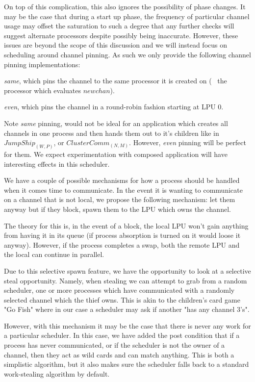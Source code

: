 On top of this complication, this also ignores the possibility of phase changes.
It may be the case that during a start up phase, the frequency of particular 
channel usage may offset the saturation to such a degree that any further 
checks will suggest alternate processors despite possibly being inaccurate.
However, these issues are beyond the scope of this discussion and we will 
instead focus on scheduling around channel pinning. As such we only provide the
following channel pinning implementations: 
\begin{inparaenum}
\item \emph{same}, which pins the channel to the same processor it is created 
    on (\ie~ the processor which evaluates $newchan$).
\item \emph{even}, which pins the channel in a round-robin fashion starting at
    LPU $0$.
\end{inparaenum}

Note \emph{same} pinning, would not be ideal for an application which creates
all channels in one process and then hands them out to it's children like in
$JumpShip_{(W,P)}$, or $ClusterComm_{(N,M)}$. However, \emph{even} pinning will
be perfect for them. We expect experimentation with composed application will
have interesting effects in this scheduler.

We have a couple of possible mechanisms for how a process should be handled when
it comes time to communicate. In the event it is wanting to communicate on a 
channel that is not local, we propose the following mechanism: let them anyway
but if they block, spawn them to the LPU which owns the channel.

The theory for this is, in the event of a block, the local LPU won't gain 
anything from having it in its queue (if process absorption is turned on it would 
loose it anyway). However, if the process completes a swap, both the remote
LPU and the local can continue in parallel.

Due to this selective spawn feature, we have the opportunity to look at a 
selective steal opportunity. Namely, when stealing we can attempt to grab from
a random scheduler, one or more processes which have communicated with a 
randomly selected channel which the thief owns. This is akin to the children's
card game "Go Fish" where in our case a scheduler may ask if another "has any
channel 3's".

However, with this mechanism it may be the case that there is never any work
for a particular scheduler. In this case, we have added the post condition that
if a process has never communicated, or if the scheduler is not the owner of a
channel, then they act as wild cards and can match anything. This is both a 
simplistic algorithm, but it also makes sure the scheduler falls back to a 
standard work-stealing algorithm by default.


